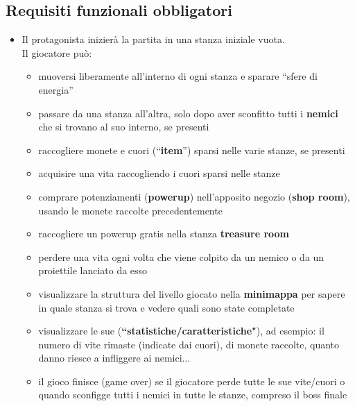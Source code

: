 \documentclass[a4paper,12pt]{report}
\begin{document}
\subsection*{Requisiti funzionali obbligatori}
\begin{itemize}
    \item Il protagonista inizierà la partita in una stanza iniziale vuota.
    \\Il giocatore può:
    \begin{itemize}
        \item muoversi liberamente all'interno di ogni stanza e sparare ``sfere di energia''
        \item passare da una stanza all'altra, solo dopo aver sconfitto tutti i \textbf{nemici} che si trovano al suo interno, se presenti
        \item raccogliere monete e cuori (``\textbf{item}'') sparsi nelle varie stanze, se presenti
        \item acquisire una vita raccogliendo i cuori sparsi nelle stanze
        \item comprare potenziamenti (\textbf{powerup}) nell'apposito negozio (\textbf{shop room}), usando le monete raccolte precedentemente
        \item raccogliere un powerup gratis nella stanza \textbf{treasure room}
        \item perdere una vita ogni volta che viene colpito da un nemico o da un proiettile lanciato da esso
        \item visualizzare la struttura del livello giocato nella \textbf{minimappa} per sapere in quale stanza si trova e vedere quali sono state completate
        \item visualizzare le sue (\textbf{``statistiche/caratteristiche"}), ad esempio: il numero di vite rimaste (indicate dai cuori), di monete raccolte, quanto danno riesce a infliggere ai nemici...
        \item il gioco finisce (game over) se il giocatore perde tutte le sue vite/cuori o quando sconfigge tutti i nemici in tutte le stanze, compreso il boss finale
    \end{itemize}
    

\end{itemize}
\end{document}
